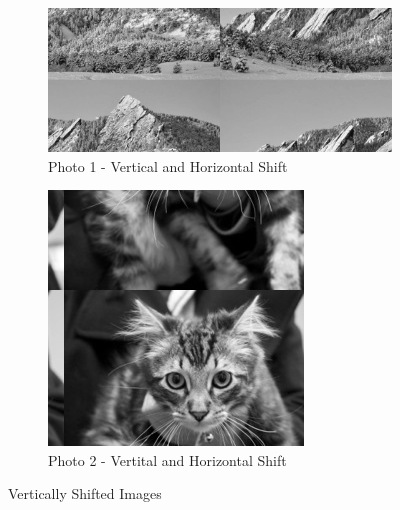 \begin{figure}[ht]
  \centering
  \begin{subfigure}{\textwidth}
    \centering
    \includegraphics[scale=0.7]{./img/vhsg1.png}
    \caption{Photo 1 - Vertical and
    Horizontal Shift}
    \label{fig:p1vg}
  \end{subfigure}
  \begin{subfigure}{\textwidth}
    \centering
    \includegraphics[scale=0.7]{./img/vhsg2.png}
    \caption{Photo
      2
      -
      Vertital
      and
      Horizontal
    Shift}
    \label{fig:p2vg}
  \end{subfigure}
  \caption{Vertically
    Shifted
  Images}
  \label{fig:vs_images}
\end{figure}
